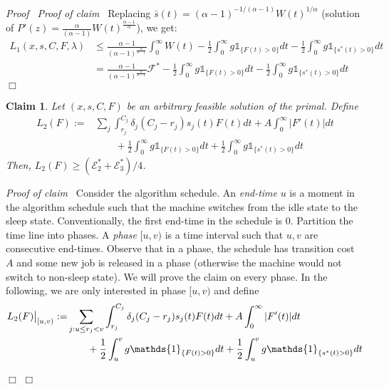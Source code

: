 \documentclass[11pt]{article}
\newenvironment{proof}{\noindent\emph{Proof\ }}{\hspace*{\fill}$\Box$\medskip}
\newenvironment{claimproof}{\noindent\emph{Proof of claim\ }}{\hspace*{\fill}$\Box$\medskip}
\newtheorem{claim}{Claim}
\newcommand\restr[2]{{\left.\kern-\nulldelimiterspace #1 \vphantom{\big|} \right|_{#2} }}
\newcommand{\one}{\ensuremath{\mathds{1}}}
\begin{document}
\begin{proof}
\begin{claimproof}
Replacing $\bar{s}(t) =  (\alpha-1)^{-1/(\alpha-1)} W(t)^{1/\alpha}$
(solution of $P'(z) = \frac{\alpha}{(\alpha-1)} W(t)^{\frac{\alpha-1}{\alpha}}$), 
we get:
\begin{align*}
L_{1}(x,s,C, F, \lambda) 
		&\leq \frac{\alpha-1}{(\alpha-1)^{\frac{\alpha}{\alpha-1}}} 
			 \int_{0}^{\infty} W(t) 
			- \frac{1}{2} \int_{0}^{\infty} g\one_{\{F(t) > 0\}} dt 
			- \frac{1}{2} \int_{0}^{\infty} g\one_{\{s^{*}(t) > 0\}}  dt \\
&= \frac{\alpha-1}{(\alpha-1)^{\frac{\alpha}{\alpha-1}}} 
			\mathcal{F}^{*}
			- \frac{1}{2} \int_{0}^{\infty} g\one_{\{F(t) > 0\}} dt 
			- \frac{1}{2} \int_{0}^{\infty} g \one_{\{s^{*}(t) > 0\}}  dt
\end{align*}
\end{claimproof}

\begin{claim}		\label{claim:general-energy-L2}
Let $(x,s,C,F)$ be an arbitrary feasible solution of the primal. 
Define
\begin{align*}
L_{2}(F) := &\sum_{j} \int_{r_{j}}^{C_{j}}  \delta_{j}(C_{j} - r_{j}) s_{j}(t)F(t)dt + A \int_{0}^{\infty} |F'(t)|dt \\
& \qquad + \frac{1}{2} \int_{0}^{\infty} g\one_{\{F(t) > 0\}} dt 
			+ \frac{1}{2} \int_{0}^{\infty} g\one_{\{s^{*}(t) > 0\}} dt
\end{align*}
Then, $L_{2}(F) \geq (\mathcal{E}^{*}_{2} + \mathcal{E}^{*}_{3})/4$.
\end{claim}
\begin{claimproof}
Consider the algorithm schedule. An \emph{end-time} $u$ is a moment in the algorithm schedule such
that the machine switches from the idle state to the sleep state. 
Conventionally, the first end-time in the schedule is 0. 
Partition the time line into phases. A \emph{phase} $[u,v)$ is a time interval such that $u,v$
are consecutive end-times. Observe that in a phase, the schedule
has transition cost $A$ and some new job is released in a phase
(otherwise the machine would not switch to non-sleep state).
We will prove the claim on every phase. In the following, 
we are only interested in phase $[u,v)$ and define 
\begin{align*}
\restr{L_{2}(F)}{[u,v)} := &\sum_{j: u \leq r_{j} < v} \int_{r_{j}}^{C_{j}}  \delta_{j}(C_{j} - r_{j}) s_{j}(t)F(t)dt 
					+ A \int_{0}^{\infty} |F'(t)|dt \\
& \qquad + \frac{1}{2} \int_{u}^{v} g\one_{\{F(t) > 0\}} dt 
			+ \frac{1}{2} \int_{u}^{v} g\one_{\{s^{*}(t) > 0\}} dt
\end{align*}



\end{claimproof}
\end{proof}
\end{document}
